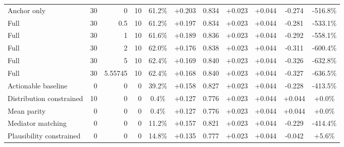 \begin{table}[htbp]
\begin{tabular}{lrrrccccccc}
Anchor only & 30 & 0 & 10 & 61.2\% & +0.203 & 0.834 & +0.023 & +0.044 & -0.274 & -516.8\% \\
Full & 30 & 0.5 & 10 & 61.2\% & +0.197 & 0.834 & +0.023 & +0.044 & -0.281 & -533.1\% \\
Full & 30 & 1 & 10 & 61.6\% & +0.189 & 0.836 & +0.023 & +0.044 & -0.292 & -558.1\% \\
Full & 30 & 2 & 10 & 62.0\% & +0.176 & 0.838 & +0.023 & +0.044 & -0.311 & -600.4\% \\
Full & 30 & 5 & 10 & 62.4\% & +0.169 & 0.840 & +0.023 & +0.044 & -0.326 & -632.8\% \\
Full & 30 & 5.55745 & 10 & 62.4\% & +0.168 & 0.840 & +0.023 & +0.044 & -0.327 & -636.5\% \\
Actionable baseline & 0 & 0 & 0 & 39.2\% & +0.158 & 0.827 & +0.023 & +0.044 & -0.228 & -413.5\% \\
Distribution constrained & 10 & 0 & 0 & 0.4\% & +0.127 & 0.776 & +0.023 & +0.044 & +0.044 & +0.0\% \\
Mean parity & 0 & 0 & 0 & 0.4\% & +0.127 & 0.776 & +0.023 & +0.044 & +0.044 & +0.0\% \\
Mediator matching & 0 & 0 & 0 & 11.2\% & +0.157 & 0.821 & +0.023 & +0.044 & -0.229 & -414.4\% \\
Plausibility constrained & 0 & 0 & 0 & 14.8\% & +0.135 & 0.777 & +0.023 & +0.044 & -0.042 & +5.6\% \\
\bottomrule
\end{tabular}
\end{table}